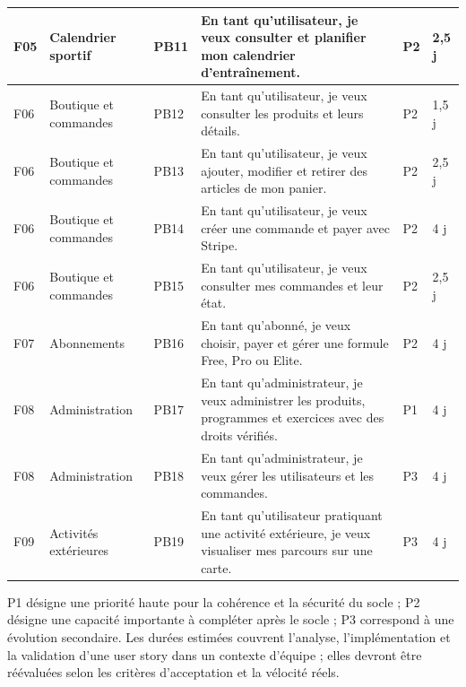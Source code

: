 ﻿\documentclass[12pt,a4paper]{report}
\begin{document}
\begin{singlespace}
\begin{longtable}{|p{1cm}|p{4cm}|p{0.9cm}|p{7cm}|p{1.4cm}|p{1.35cm}|}
F05 & Calendrier sportif & PB11 & En tant qu'utilisateur, je veux consulter et planifier mon calendrier d'entraînement. & P2 & 2,5 j \\\hline
F06 & Boutique et commandes & PB12 & En tant qu'utilisateur, je veux consulter les produits et leurs détails. & P2 & 1,5 j \\\hline
F06 & Boutique et commandes & PB13 & En tant qu'utilisateur, je veux ajouter, modifier et retirer des articles de mon panier. & P2 & 2,5 j \\\hline
F06 & Boutique et commandes & PB14 & En tant qu'utilisateur, je veux créer une commande et payer avec Stripe. & P2 & 4 j \\\hline
F06 & Boutique et commandes & PB15 & En tant qu'utilisateur, je veux consulter mes commandes et leur état. & P2 & 2,5 j \\\hline
F07 & Abonnements & PB16 & En tant qu'abonné, je veux choisir, payer et gérer une formule Free, Pro ou Elite. & P2 & 4 j \\\hline
F08 & Administration & PB17 & En tant qu'administrateur, je veux administrer les produits, programmes et exercices avec des droits vérifiés. & P1 & 4 j \\\hline
F08 & Administration & PB18 & En tant qu'administrateur, je veux gérer les utilisateurs et les commandes. & P3 & 4 j \\\hline
F09 & Activités extérieures & PB19 & En tant qu'utilisateur pratiquant une activité extérieure, je veux visualiser mes parcours sur une carte. & P3 & 4 j \\\hline
\end{longtable}
\end{singlespace}
\normalsize

P1 désigne une priorité haute pour la cohérence et la sécurité du socle ; P2 désigne une capacité importante à compléter après le socle ; P3 correspond à une évolution secondaire. Les durées estimées couvrent l'analyse, l'implémentation et la validation d'une user story dans un contexte d'équipe ; elles devront être réévaluées selon les critères d'acceptation et la vélocité réels.
\end{document}
